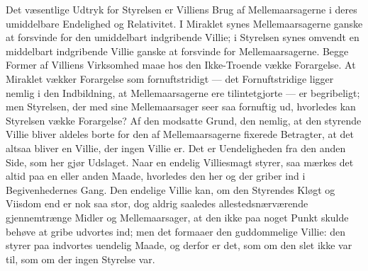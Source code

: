 \documentclass[12pt]{book}
\begin{document}
Det væsentlige Udtryk for Styrelsen er Villiens Brug af
Mellemaarsagerne i deres umiddelbare Endelighed og Relativitet. I
Miraklet synes Mellemaarsagerne ganske at forsvinde for den
umiddelbart indgribende Villie; i Styrelsen synes omvendt en
middelbart indgribende
Villie ganske at forsvinde for Mellemaarsagerne. Begge Former af
Villiens Virksomhed maae hos den Ikke-Troende vække Forargelse. At
Miraklet vækker Forargelse som fornuftstridigt --- det
Fornuftstridige ligger nemlig i den Indbildning, at
Mellemaarsagerne ere tilintetgjorte --- er begribeligt; men
Styrelsen, der med sine Mellemaarsager seer saa fornuftig ud,
hvorledes kan Styrelsen vække Forargelse? Af den modsatte Grund,
den nemlig, at den styrende Villie bliver aldeles borte for den af
Mellemaarsagerne fixerede Betragter, at det altsaa bliver en Villie,
der ingen Villie er. Det er Uendeligheden fra den anden Side, som
her gjør Udslaget. Naar en endelig Villiesmagt styrer, saa mærkes
det altid paa en eller anden Maade, hvorledes den her og der griber
ind i Begivenhedernes Gang. Den endelige Villie kan, om den
Styrendes Kløgt og Viisdom end er nok saa stor, dog aldrig saaledes
allestedsnærværende gjennemtrænge Midler og Mellemaarsager, at den
ikke paa noget Punkt skulde behøve at gribe udvortes ind; men det
formaaer den guddommelige Villie: den styrer paa indvortes uendelig
Maade, og derfor er det, som om den slet ikke var til, som om der
ingen Styrelse var.
\end{document}
